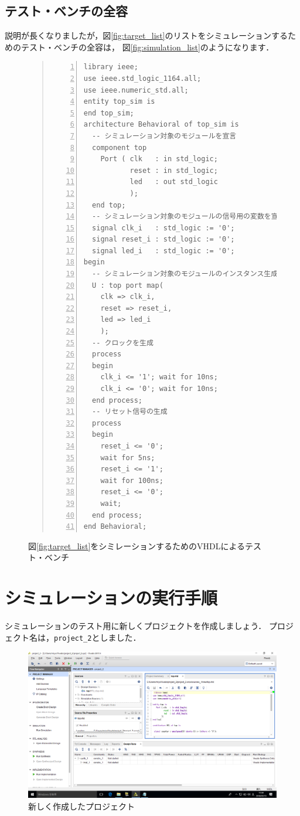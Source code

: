 \documentclass[a4paper,dvipdfmx]{jsarticle}
\begin{document}
\subsection{テスト・ベンチの全容}

説明が長くなりましたが，図\ref{fig:target_list}のリストをシミュレーションするためのテスト・ベンチの全容は，
図\ref{fig:simulation_list}のようになります．

\begin{figure}[H]
\begin{quote}
\begin{Verbatim}[frame=single, numbers=left, baselinestretch=0.8]
library ieee;
use ieee.std_logic_1164.all;
use ieee.numeric_std.all;
entity top_sim is
end top_sim;
architecture Behavioral of top_sim is
  -- シミュレーション対象のモジュールを宣言
  component top
    Port ( clk   : in std_logic;
           reset : in std_logic;
           led   : out std_logic
           );
  end top;
  -- シミュレーション対象のモジュールの信号用の変数を宣言
  signal clk_i   : std_logic := '0';
  signal reset_i : std_logic := '0';
  signal led_i   : std_logic := '0';
begin
  -- シミュレーション対象のモジュールのインスタンス生成
  U : top port map(
    clk => clk_i,
    reset => reset_i,
    led => led_i
    );
  -- クロックを生成
  process
  begin
    clk_i <= '1'; wait for 10ns;
    clk_i <= '0'; wait for 10ns;
  end process;
  -- リセット信号の生成
  process
  begin
    reset_i <= '0';
    wait for 5ns;
    reset_i <= '1';
    wait for 100ns;
    reset_i <= '0';
    wait;
  end process;
end Behavioral;
\end{Verbatim}
\end{quote}
\caption{図\ref{fig:target_list}をシミレーションするためのVHDLによるテスト・ベンチ}
\end{figure}

\section{シミュレーションの実行手順}

シミュレーションのテスト用に新しくプロジェクトを作成しましょう．
プロジェクト名は，\verb|project_2|としました．

 \begin{figure}[H]
  \begin{center}
   \includegraphics[width=.8\textwidth]{chapter04_figures/VirtualBox_Windows10_19_03_2018_11_59_40.png}
  \end{center}
  \caption{新しく作成したプロジェクト}
 \end{figure}
\end{document}
